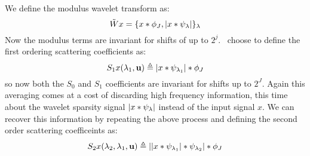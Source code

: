 We define the modulus wavelet transform as:
\begin{equation}
  \tilde{W}x = \{ x \ast \phi_J, |x \ast \psi_\lambda| \}_\lambda \label{eq:ch2:wave3}
\end{equation}
Now the modulus terms are invariant for shifts of up to $2^j$. \Mallat\ choose to
define the first ordering scattering coefficients as:
\begin{equation}
  S_1x(\lambda_1, \mathbf{u}) \triangleq |x \ast \psi_{\lambda_1}| \ast \phi_J
\end{equation}
so now both the $S_0$ and $S_1$ coefficients are invariant for shifts up
to $2^J$. Again this averaging comes at a cost of discarding high frequency information,
this time about the wavelet sparsity signal $|x \ast \psi_\lambda|$ instead of the input 
signal $x$. We can recover this information by repeating the above process and defining the
second order scattering coefficeints as:
\begin{equation}
  S_2x(\lambda_2, \lambda_1, \mathbf{u}) \triangleq || x \ast \psi_{\lambda_1}|
  \ast \psi_{\lambda_2}| \ast \phi_J
\end{equation}


